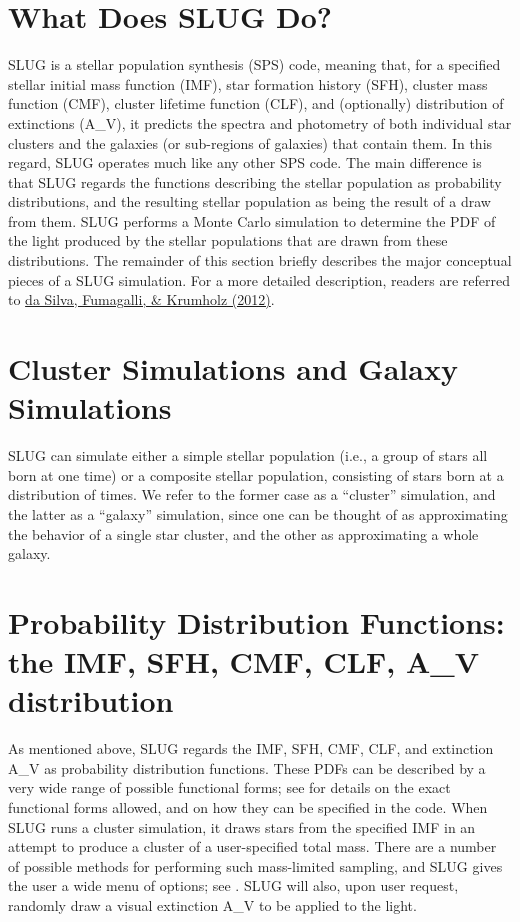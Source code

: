 \documentclass[letterpaper,10pt,english]{sphinxmanual}
\begin{document}
\section{What Does SLUG Do?}
\label{intro:what-does-slug-do}
SLUG is a stellar population synthesis (SPS) code, meaning that, for a specified stellar initial mass function (IMF), star formation history (SFH), cluster mass function (CMF), cluster lifetime function (CLF), and (optionally) distribution of extinctions (A\_V), it predicts the spectra and photometry of both individual star clusters and the galaxies (or sub-regions of galaxies) that contain them. In this regard, SLUG operates much like any other SPS code. The main difference is that SLUG regards the functions describing the stellar population as probability distributions, and the resulting stellar population as being the result of a draw from them. SLUG performs a Monte Carlo simulation to determine the PDF of the light produced by the stellar populations that are drawn from these distributions. The remainder of this section briefly describes the major conceptual pieces of a SLUG simulation. For a more detailed description, readers are referred to \href{http://adsabs.harvard.edu/abs/2012ApJ...745..145D}{da Silva, Fumagalli, \& Krumholz (2012)}.


\section{Cluster Simulations and Galaxy Simulations}
\label{intro:cluster-simulations-and-galaxy-simulations}
SLUG can simulate either a simple stellar population (i.e., a group of stars all born at one time) or a composite stellar population, consisting of stars born at a distribution of times. We refer to the former case as a ``cluster'' simulation, and the latter as a ``galaxy'' simulation, since one can be thought of as approximating the behavior of a single star cluster, and the other as approximating a whole galaxy.


\section{Probability Distribution Functions: the IMF, SFH, CMF, CLF, A\_V distribution}
\label{intro:probability-distribution-functions-the-imf-sfh-cmf-clf-a-v-distribution}\label{intro:ssec-slugpdfs}
As mentioned above, SLUG regards the IMF, SFH, CMF, CLF, and extinction A\_V as probability distribution functions. These PDFs can be described by a very wide range of possible functional forms; see {\hyperref[pdfs:sec-pdfs]{\emph{}}} for details on the exact functional forms allowed, and on how they can be specified in the code. When SLUG runs a cluster simulation, it draws stars from the specified IMF in an attempt to produce a cluster of a user-specified total mass. There are a number of possible methods for performing such mass-limited sampling, and SLUG gives the user a wide menu of options; see {\hyperref[pdfs:sec-pdfs]{\emph{}}}. SLUG will also, upon user request, randomly draw a visual extinction A\_V to be applied to the light.
\end{document}

